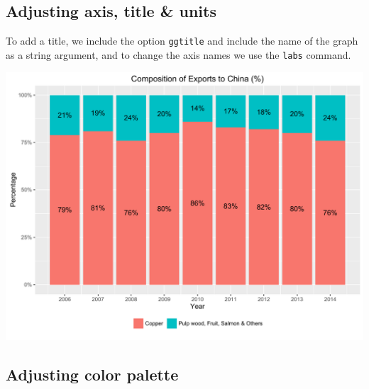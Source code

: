 \documentclass[]{article}
\newenvironment{Shaded}{\begin{snugshade}}{\end{snugshade}}
\newcommand{\KeywordTok}[1]{\textcolor[rgb]{0.13,0.29,0.53}{\textbf{{#1}}}}
\newcommand{\DataTypeTok}[1]{\textcolor[rgb]{0.13,0.29,0.53}{{#1}}}
\newcommand{\StringTok}[1]{\textcolor[rgb]{0.31,0.60,0.02}{{#1}}}
\newcommand{\NormalTok}[1]{{#1}}
\begin{document}
\subsection{Adjusting axis, title \&
units}\label{adjusting-axis-title-units}

To add a title, we include the option \texttt{ggtitle} and include the
name of the graph as a string argument, and to change the axis names we
use the \texttt{labs} command.

\begin{Shaded}
\end{Shaded}

\begin{center}\includegraphics{0_all_posts_pdf/stacked_7-1} \end{center}

\subsection{Adjusting color palette}\label{adjusting-color-palette-3}
\end{document}
